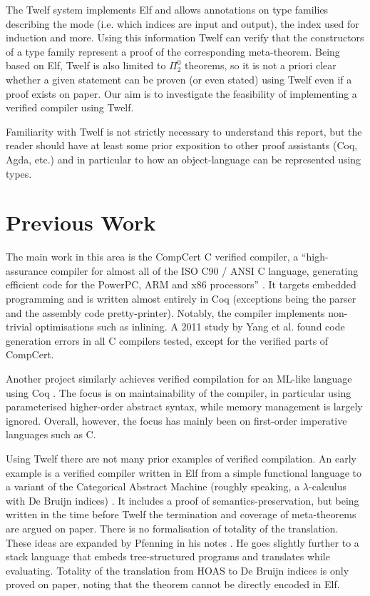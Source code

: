The Twelf system implements Elf and allows annotations on type families describing the mode (i.e. which indices are input and output), the index used for induction and more.
Using this information Twelf can verify that the constructors of a type family represent a proof of the corresponding meta-theorem.
Being based on Elf, Twelf is also limited to $\Pi_2^0$ theorems, so it is not a priori clear whether a given statement can be proven (or even stated) using Twelf even if a proof exists on paper.
Our aim is to investigate the feasibility of implementing a verified compiler using Twelf.

Familiarity with Twelf is not strictly necessary to understand this report, but the reader should have at least some prior exposition to other proof assistants (Coq, Agda, etc.) and in particular to how an object-language can be represented using types.


\section{Previous Work}

The main work in this area is the CompCert C verified compiler, a ``high-assurance compiler for almost all of the ISO C90 / ANSI C language, generating efficient code for the PowerPC, ARM and x86 processors'' \cite{CompCert16}.
It targets embedded programming and is written almost entirely in Coq (exceptions being the parser and the assembly code pretty-printer).
Notably, the compiler implements non-trivial optimisations such as inlining.
A 2011 study by Yang et al. \cite{Yang11} found code generation errors in all C compilers tested, except for the verified parts of CompCert.

Another project similarly achieves verified compilation for an ML-like language using Coq \cite{Chlipala10}.
The focus is on maintainability of the compiler, in particular using parameterised higher-order abstract syntax, while memory management is largely ignored.
Overall, however, the focus has mainly been on first-order imperative languages such as C.

Using Twelf there are not many prior examples of verified compilation.
An early example is a verified compiler written in Elf from a simple functional language to a variant of the Categorical Abstract Machine (roughly speaking, a $\lambda$-calculus with De Bruijn indices) \cite{Hannan92}.
It includes a proof of semantics-preservation, but being written in the time before Twelf the termination and coverage of meta-theorems are argued on paper.
There is no formalisation of totality of the translation.
These ideas are expanded by Pfenning in his notes \cite[ch. 6]{Pfenning01}.
He goes slightly further to a stack language that embeds tree-structured programs and translates while evaluating.
Totality of the translation from HOAS to De Bruijn indices is only proved on paper, noting that the theorem cannot be directly encoded in Elf.

